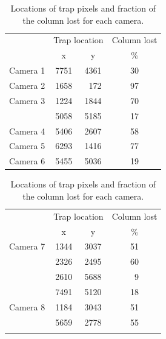 \begin{colsection}
\begin{colsection}
\begin{table}[t]
    \begin{center}
        \begin{tabular}{c|ccc} %
             & \multicolumn{2}{c}{Trap location} & Column lost \\
             & x & y & \% \\
            \midrule
            Camera 1 & 7751 & 4361 & 30 \\
            Camera 2 & 1658 & ~172 & 97 \\ %
            Camera 3 & 1224 & 1844 & 70 \\
                     & 5058 & 5185 & 17 \\
            Camera 4 & 5406 & 2607 & 58 \\
            Camera 5 & 6293 & 1416 & 77 \\
            Camera 6 & 5455 & 5036 & 19 \\
        \end{tabular}
        \hspace{0.5cm}
        \begin{tabular}{c|ccc} %
            & \multicolumn{2}{c}{Trap location} & Column lost \\
            & x & y & \% \\
            \midrule
            Camera 7 & 1344 & 3037 & 51 \\
                     & 2326 & 2495 & 60 \\
                     & 2610 & 5688 & ~9 \\ %
                     & 7491 & 5120 & 18 \\
            Camera 8 & 1184 & 3043 & 51 \\
                     & 5659 & 2778 & 55 \\
            \multicolumn{4}{c}{} \\
        \end{tabular}
    \end{center}
    \caption[Locations of trap pixels]{
        Locations of trap pixels and fraction of the column lost for each camera.
    }\label{tab:traps}
\end{table}


\end{colsection}
\end{colsection}
